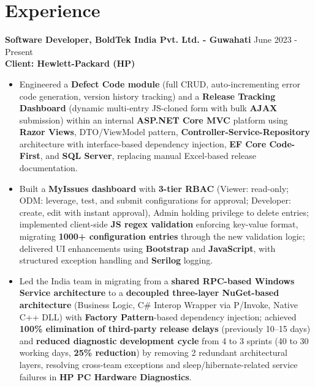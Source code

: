 \documentclass[a4paper,10pt]{article}
\begin{document}
\section*{Experience}

\textbf{Software Developer, BoldTek India Pvt. Ltd. - Guwahati} \hfill June 2023 - Present \\
\textbf{Client: Hewlett-Packard (HP)}

\begin{itemize}[leftmargin=*, itemsep=5pt, parsep=0pt, topsep=2pt]

\item Engineered a \textbf{Defect Code module} (full CRUD, auto-incrementing error code generation, version history tracking) and a \textbf{Release Tracking Dashboard} (dynamic multi-entry JS-cloned form with bulk \textbf{AJAX} submission) within an internal \textbf{ASP.NET Core MVC} platform using \textbf{Razor Views}, DTO/ViewModel pattern, \textbf{Controller-Service-Repository} architecture with interface-based dependency injection, \textbf{EF Core Code-First}, and \textbf{SQL Server}, replacing manual Excel-based release documentation.

\item Built a \textbf{MyIssues dashboard} with \textbf{3-tier RBAC} (Viewer: read-only; ODM: leverage, test, and submit configurations for approval; Developer: create, edit with instant approval), Admin holding privilege to delete entries; implemented client-side \textbf{JS regex validation} enforcing key-value format, migrating \textbf{1000+ configuration entries} through the new validation logic; delivered UI enhancements using \textbf{Bootstrap} and \textbf{JavaScript}, with structured exception handling and \textbf{Serilog} logging.

\item Led the India team in migrating from a \textbf{shared RPC-based Windows Service architecture} to a \textbf{decoupled three-layer NuGet-based architecture} (Business Logic, C\# Interop Wrapper via P/Invoke, Native C++ DLL) with \textbf{Factory Pattern}-based dependency injection; achieved \textbf{100\% elimination of third-party release delays} (previously 10--15 days) and \textbf{reduced diagnostic development cycle} from 4 to 3 sprints (40 to 30 working days, \textbf{25\% reduction}) by removing 2 redundant architectural layers, resolving cross-team exceptions and sleep/hibernate-related service failures in \textbf{HP PC Hardware Diagnostics}.


\end{itemize}
\end{document}
